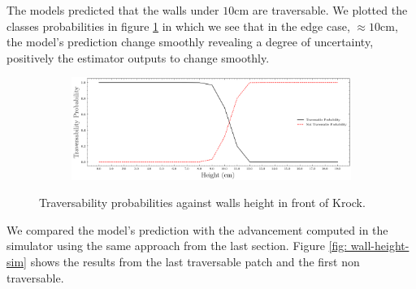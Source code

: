 \documentclass[../document.tex]{subfiles}
\begin{document}
The models predicted that the walls under $10$cm are traversable. We plotted the classes probabilities in figure \ref{fig : walls-height-preds} in which we see that in the edge case, $\approx 10$cm, the model's prediction change smoothly revealing a degree of uncertainty, positively the estimator outputs to change smoothly.
\begin{figure}[htbp]
    \centering
\begin{subfigure}[b]{1\textwidth}
    \includegraphics[width=\linewidth]{../img/5/custom_patches/walls_increasing/predictions.png}
    \end{subfigure}
    \caption{Traversability probabilities against walls height in front of Krock.}
\label{fig : walls-height-preds}
\end{figure}

We compared the model's prediction with the advancement computed in the simulator using the same approach from the last section. Figure \ref{fig: wall-height-sim} shows the results from the last traversable patch and the first non traversable.
\end{document}
